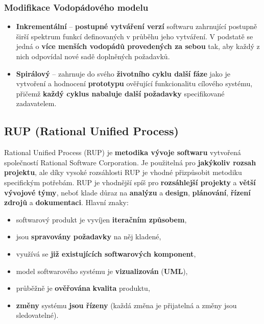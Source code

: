 \subsubsection{Modifikace Vodopádového modelu}
\begin{itemize}
\item \textbf{Inkrementální} -- \textbf{postupné vytváření verzí} softwaru zahrnující postupně širší spektrum funkcí definovaných v průběhu jeho vytváření. V podstatě se jedná o \textbf{více menších vodopádů provedených za sebou} tak, aby každý z nich odpovídal nové sadě doplněných požadavků.
\item \textbf{Spirálový} -- zahrnuje do svého \textbf{životního cyklu další fáze} jako je vytvoření a hodnocení \textbf{prototypu} ověřující funkcionalitu cílového systému, přičemž \textbf{každý cyklus nabaluje další požadavky} specifikované zadavatelem.
\end{itemize}


\subsection{RUP (Rational Unified Process)}
Rational Unified Process (RUP) je \textbf{metodika vývoje softwaru} vytvořená společností Rational Software Corporation. Je použitelná pro \textbf{jakýkoliv rozsah projektu}, ale díky vysoké rozsáhlosti RUP je vhodné přizpůsobit metodiku specifickým potřebám. RUP je vhodnější spíš pro \textbf{rozsáhlejší projekty} a \textbf{větší vývojové týmy}, neboť klade důraz na \textbf{analýzu} a \textbf{design}, \textbf{plánování}, \textbf{řízení zdrojů} a \textbf{dokumentaci}. Hlavní znaky:

\begin{itemize}
\item softwarový produkt je vyvíjen \textbf{iteračním způsobem},
\item jsou \textbf{spravovány požadavky} na něj kladené,
\item využívá se \textbf{již existujících softwarových komponent},
\item model softwarového systému je \textbf{vizualizován} (\textbf{UML}),
\item průběžně je \textbf{ověřována} \textbf{kvalita} produktu,
\item \textbf{změny} systému\textbf{ jsou řízeny} (každá změna je přijatelná a změny jsou sledovatelné).
\end{itemize}

